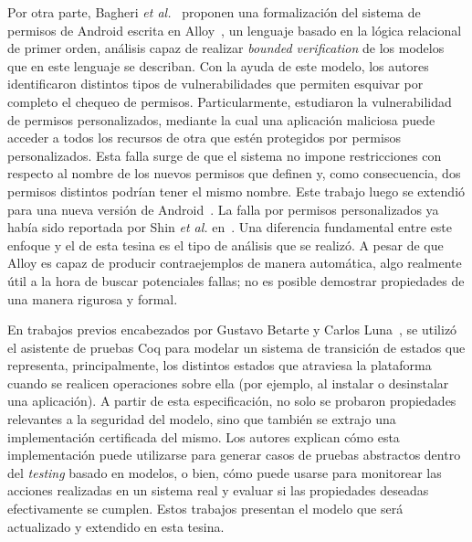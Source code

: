 Por otra parte, Bagheri \textit{et al.}~\cite{bagheri15} proponen una
formalización del sistema de permisos de Android escrita en Alloy~\cite{alloy},
un lenguaje basado en la lógica relacional de primer orden,
%
%
análisis capaz de realizar \textit{bounded verification} de los modelos que en
este lenguaje se describan. Con la ayuda de este modelo, los autores
identificaron distintos tipos de vulnerabilidades que permiten esquivar por
completo el chequeo de permisos. Particularmente, estudiaron la vulnerabilidad
de permisos personalizados, mediante la cual una aplicación maliciosa puede
acceder a todos los recursos de otra que estén protegidos por permisos
personalizados. Esta falla surge de que el sistema no impone restricciones con
respecto al nombre de los nuevos permisos que definen y, como consecuencia, dos
permisos distintos podrían tener el mismo nombre. Este trabajo luego se extendió
para una nueva versión de Android~\cite{bagheri}. La falla por permisos
personalizados ya había sido reportada por Shin \textit{et al.}
en~\cite{shin-custom}.
%
%
Una diferencia fundamental entre este enfoque y el de esta tesina es el tipo de
análisis que se realizó. A pesar de que Alloy es capaz de producir
contraejemplos de manera automática, algo realmente útil a la hora de buscar
potenciales fallas; no es posible demostrar propiedades de una manera rigurosa y
formal.

En trabajos previos encabezados por Gustavo Betarte y Carlos
Luna~\cite{betarte-2017, betarte-2016, luna-cleiej}, se utilizó el asistente de
%
%
pruebas Coq para modelar un sistema de transición de estados que representa,
principalmente, los distintos estados que atraviesa la plataforma cuando se
realicen operaciones sobre ella (por ejemplo, al instalar o desinstalar una
aplicación). A partir de esta especificación, no solo se probaron propiedades
relevantes a la seguridad del modelo, sino que también se extrajo una
implementación certificada del mismo. Los autores explican cómo esta
implementación puede utilizarse para generar casos de pruebas abstractos dentro
del \textit{testing} basado en modelos, o bien, cómo puede usarse para
monitorear las acciones realizadas en un sistema real y evaluar si las
propiedades deseadas efectivamente se cumplen. Estos trabajos presentan el
modelo que será actualizado y extendido en esta tesina.

